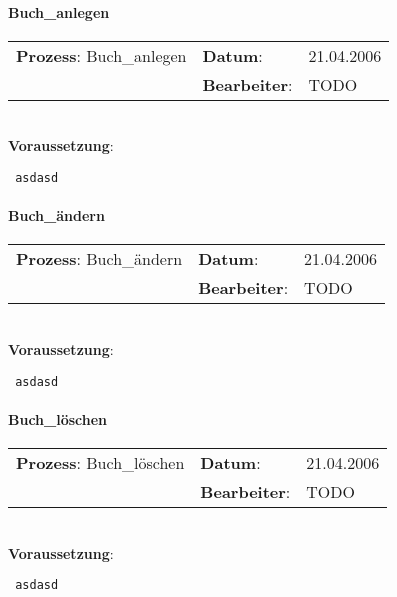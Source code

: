 \paragraph{Buch\_anlegen}
\begin{tabular}[t]{p{9.5cm}ll}
\textbf{Prozess}: Buch\_anlegen  	&\textbf{Datum}:      &21.04.2006\\
					&\textbf{Bearbeiter}: &TODO\\
\end{tabular}

\hrulefill\\
\textbf{Voraussetzung}:
\begin{verbatim}
 asdasd
\end{verbatim}
\hrulefill



\paragraph{Buch\_ändern}
\begin{tabular}[t]{p{9.5cm}ll}
\textbf{Prozess}: Buch\_ändern  	&\textbf{Datum}:      &21.04.2006\\
					&\textbf{Bearbeiter}: &TODO\\
\end{tabular}

\hrulefill\\
\textbf{Voraussetzung}:
\begin{verbatim}
 asdasd
\end{verbatim}
\hrulefill



\paragraph{Buch\_löschen}
\begin{tabular}[t]{p{9.5cm}ll}
\textbf{Prozess}: Buch\_löschen  	&\textbf{Datum}:      &21.04.2006\\
					&\textbf{Bearbeiter}: &TODO\\
\end{tabular}

\hrulefill\\
\textbf{Voraussetzung}:
\begin{verbatim}
 asdasd
\end{verbatim}
\hrulefill